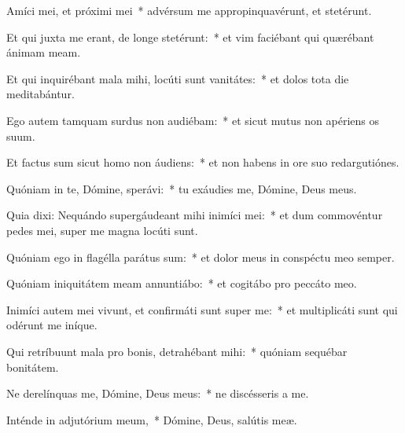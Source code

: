 
\item Amíci mei, et próximi mei~* advérsum me appropinquavérunt, et stetérunt.

\item Et qui juxta me erant, de longe stetérunt:~* et vim faciébant qui quærébant ánimam meam.

\item Et qui inquirébant mala mihi, locúti sunt vanitátes:~* et dolos tota die meditabántur.

\item Ego autem tamquam surdus non audiébam:~* et sicut mutus non apériens os suum.

\item Et factus sum sicut homo non áudiens:~* et non habens in ore suo redargutiónes.

\item Quóniam in te, Dómine, sperávi:~* tu exáudies me, Dómine, Deus meus.

\item Quia dixi: Nequándo supergáudeant mihi inimíci mei:~* et dum commovéntur pedes mei, super me magna locúti sunt.

\item Quóniam ego in flagélla parátus sum:~* et dolor meus in conspéctu meo semper.

\item Quóniam iniquitátem meam annuntiábo:~* et cogitábo pro peccáto meo.

\item Inimíci autem mei vivunt, et confirmáti sunt super me:~* et multiplicáti sunt qui odérunt me iníque.

\item Qui retríbuunt mala pro bonis, detrahébant mihi:~* quóniam sequébar bonitátem.

\item Ne derelínquas me, Dómine, Deus meus:~* ne discésseris a me.

\item Inténde in adjutórium meum,~* Dómine, Deus, salútis meæ.